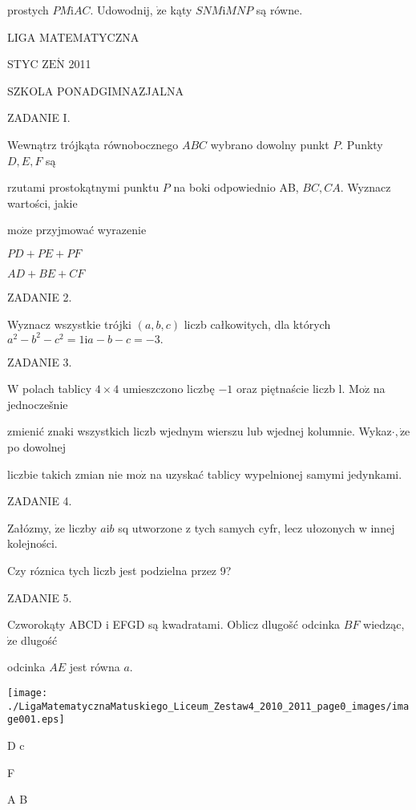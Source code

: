 \documentclass[a4paper,12pt]{article}
\begin{document}
prostych $PM\mathrm{i}AC$. Udowodnij, $\dot{\mathrm{z}}\mathrm{e}$ kąty $SNM\mathrm{i}MNP$ są równe.






LIGA MATEMATYCZNA

STYC Z$\mathrm{E}\acute{\mathrm{N}}$ 2011

SZKOLA PONADGIMNAZJALNA

ZADANIE I.

Wewnątrz trójkąta równobocznego $ABC$ wybrano dowolny punkt $P$. Punkty $D, E, F$ są

rzutami prostokątnymi punktu $P$ na boki odpowiednio AB, $BC, CA$. Wyznacz wartości, jakie

$\mathrm{m}\mathrm{o}\dot{\mathrm{z}}\mathrm{e}$ przyjmować wyrazenie

$PD+PE+PF$

$AD+BE+CF$

ZADANIE 2.

Wyznacz wszystkie trójki $(a,b,c)$ liczb całkowitych, dla których $a^{2}-b^{2}-c^{2}=1\mathrm{i}a-b-c=-3.$

ZADANIE 3.

$\mathrm{W}$ polach tablicy $4\times 4$ umieszczono liczbę $-1$ oraz piętnaście liczb l. $\mathrm{M}\mathrm{o}\dot{\mathrm{z}}$ na jednoczešnie

zmienić znaki wszystkich liczb wjednym wierszu lub wjednej kolumnie. Wykaz$\cdot, \dot{\mathrm{z}}\mathrm{e}$ po dowolnej

liczbie takich zmian nie $\mathrm{m}\mathrm{o}\dot{\mathrm{z}}$ na uzyskać tablicy wypelnionej samymi jedynkami.

ZADANIE 4.

Załózmy, $\dot{\mathrm{z}}\mathrm{e}$ liczby $a\mathrm{i}b$ sq utworzone z tych samych cyfr, lecz ułozonych w innej kolejności.

Czy róznica tych liczb jest podzielna przez 9?

ZADANIE 5.

Czworokąty ABCD $\mathrm{i}$ EFGD są kwadratami. Oblicz dlugošć odcinka $BF$ wiedząc, $\dot{\mathrm{z}}\mathrm{e}$ dlugość

odcinka $AE$ jest równa $a.$
\begin{center}
\texttt{[image: ./LigaMatematycznaMatuskiego\_Liceum\_Zestaw4\_2010\_2011\_page0\_images/image001.eps]}
\end{center}
D c

F

A  B
\end{document}
